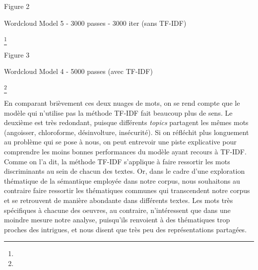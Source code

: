 \documentclass[letterpaper,portrait,12pt]{article}
\begin{document}
Figure 2








\textcolor[rgb]{0.000,0.000,0.000}{Wordcloud Model 5 - 3000 passes - 3000 iter (sans TF-IDF)}





\footnote{} 























Figure 3








Wordcloud Model 4 - 5000 passes (avec TF-IDF)





\footnote{} 














	En comparant bri\`{e}vement ces deux nuages de mots, on se rend compte que le mod\`{e}le qui n'utilise pas la m\'{e}thode TF-IDF fait beaucoup plus de sens. Le deuxi\`{e}me est tr\`{e}s redondant, puisque diff\'{e}rents \emph{topics} partagent les m\^{e}mes mots (angoisser, chloroforme, d\'{e}sinvolture, ins\'{e}curit\'{e}). Si on r\'{e}fl\'{e}chit plus longuement au probl\`{e}me qui se pose \`{a} nous, on peut entrevoir une piste explicative pour comprendre les moins bonnes performances du mod\`{e}le ayant recours \`{a} TF-IDF. Comme on l'a dit, la m\'{e}thode TF-IDF s'applique \`{a} faire ressortir les mots discriminants au sein de chacun des textes. Or, dans le cadre d'une exploration th\'{e}matique de la s\'{e}mantique employ\'{e}e dans notre corpus, nous souhaitons au contraire faire ressortir les th\'{e}matiques communes qui transcendent notre corpus et se retrouvent de mani\`{e}re abondante dans diff\'{e}rents textes. Les mots tr\`{e}s sp\'{e}cifiques \`{a} chacune des oeuvres, au contraire, n'int\'{e}ressent que dans une moindre mesure notre analyse, puisqu'ils renvoient \`{a} des th\'{e}matiques trop proches des intrigues, et nous disent que tr\`{e}s peu des repr\'{e}sentations partag\'{e}es.
\end{document}
